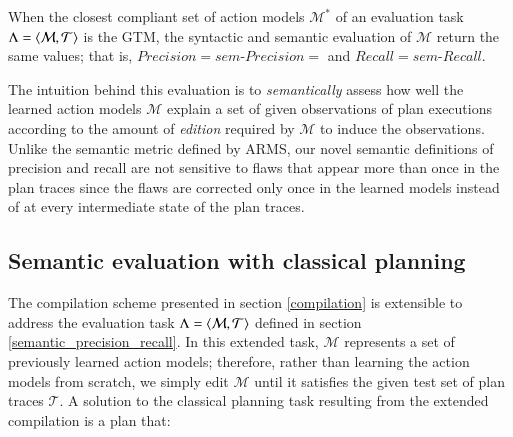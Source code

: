 \begin{myproposition}
When the closest compliant set of action models $\mathcal{M^*}$ of an evaluation task $\Lambda = {\langle \mathcal{M}, \mathcal{T} \rangle}$ is the GTM, the syntactic and semantic evaluation of $\mathcal{M}$ return the same values; that is, $Precision=sem\text{-}Precision=$ and $Recall=sem\text{-}Recall$.
\end{myproposition}


The intuition behind this evaluation is to {\em semantically} assess how well the learned action models $\mathcal{M}$ explain a set of given observations of plan executions according to the amount of {\em edition} required by $\mathcal{M}$ to induce the observations. Unlike the semantic metric defined by ARMS, our novel semantic definitions of precision and recall are not sensitive to flaws that appear more than once in the plan traces since the flaws are corrected only once in the learned models instead of at every intermediate state of the plan traces.



\subsection{Semantic evaluation with classical planning}
\label{edit_distance}


The compilation scheme presented in section \ref{compilation} is extensible to address the evaluation task $\Lambda={\langle \mathcal{M}, \mathcal{T} \rangle}$ defined in section \ref{semantic_precision_recall}. In this extended task, $\mathcal{M}$ represents a set of previously learned action models; therefore, rather than learning the action models from scratch, we simply edit $\mathcal{M}$ until it satisfies the given test set of plan traces $\mathcal{T}$. A solution to the classical planning task resulting from the extended compilation is a plan that:

